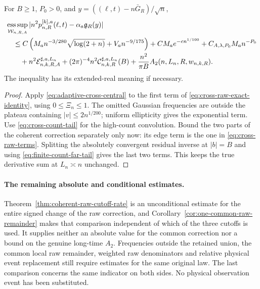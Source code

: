 \begin{corollary}
\label{cor:cross-raw-budget}
For $B\ge1$, $P_0>0$, and
$y=((\ell,t)-n\bar G_R)/\sqrt n$,
\begin{align}
 &\mathop{\rm ess\,sup}_{\mathcal W_{n,R,A}}
 |n^2p_{n,R}^{[k],a}(\ell,t)-\alpha_a\mathfrak g_R(y)|\notag\\
 &\quad\le C\left(M_an^{-3/280}\sqrt{\log(2+n)}
                              +V_an^{-9/175}\right)
        +CM_ae^{-cn^{1/100}}+C_{A,\lambda,P_0}M_an^{-P_0}\notag\\
 &\qquad+n^2\mathcal E^{\sharp,a,L_n}_{n,k,R,A}
       +(2\pi)^{-4}n^2\mathcal C^{\sharp,a,L_n}_{n,k,R}(B)
       +\frac{n^2}{\pi B}A_2(n,L_n,R,w_{n,k,R}).
 \label{eq:cross-raw-budget}
\end{align}
The inequality has its extended-real meaning if necessary.
\end{corollary}
\begin{proof}
Apply \eqref{eq:adaptive-cross-central} to the first term of
\eqref{eq:cross-raw-exact-identity}, using $0\le\Xi_n\le1$.
The omitted Gaussian frequencies are outside the plateau containing
$|v|\le2n^{1/200}$; uniform ellipticity gives the exponential term.
Use \eqref{eq:cross-count-tail} for the high-count convolution.
Bound the two parts of the coherent correction separately only now:
its edge term is the one in \eqref{eq:cross-raw-terms}. Splitting the
absolutely convergent residual inverse at $|b|=B$ and using
\eqref{eq:finite-count-far-tail} gives the last two terms. This keeps
the true derivative sum at $L_n\asymp n$ unchanged.
\end{proof}

\paragraph{The remaining absolute and conditional estimates.}
Theorem~\ref{thm:coherent-raw-cutoff-rate} is an unconditional estimate
for the entire signed change of the raw correction, and
Corollary~\ref{cor:one-common-raw-remainder} makes that comparison
independent of which of the three cutoffs is used. It supplies neither
an absolute value for the common correction nor a bound on the genuine
long-time $A_2$. Frequencies outside the retained union, the common
local raw remainder, weighted raw denominators and relative physical
event replacement still require estimates for the same original law.
The last comparison concerns the same indicator on both sides. No
physical observation event has been substituted.
